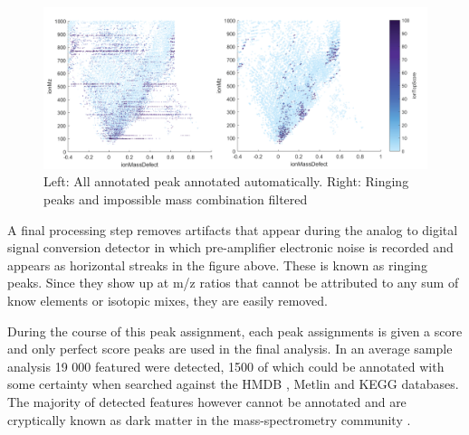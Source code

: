 \documentclass[a4paper,11pt,twoside]{book}
\begin{document}
	\begin{figure}[hb!t]
		\centering
		\includegraphics[width=1.2\linewidth]{3.Metabolomics/Peak_filtering.png}
		{\caption{Left: All annotated peak annotated automatically. Right: Ringing peaks and impossible mass combination filtered}}
		\label{Metabolomics Data Pre-Processing}
	\end{figure}

	A final processing step removes artifacts that appear during the analog to digital signal conversion detector in which pre-amplifier electronic noise is recorded and appears as horizontal streaks in the figure above. These is known as ringing peaks\citep{Goodner1998QuantitationSpectrometry}. Since they show up at m/z ratios that cannot be attributed to any sum of know elements or isotopic mixes, they are easily removed.
	
	During the course of this peak assignment, each peak assignments is given a score and only perfect score peaks are used in the final analysis. In an average sample analysis 19 000 featured were detected, 1500 of which could be annotated with some certainty when searched against the HMDB \citep{Wishart2013HMDB2013}, Metlin\citep{Smith2005METLIN} and KEGG databases\citep{Kanehisa2017}. The majority of detected features however cannot be annotated and are cryptically known as dark matter in the mass-spectrometry community \citep{Aksenov2017GlobalSpectrometry}.
	
\end{document}
